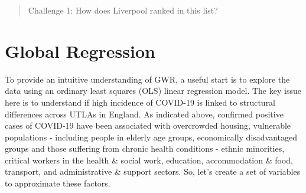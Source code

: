 \documentclass[
  letterpaper,
  DIV=11,
  numbers=noendperiod,
  oneside]{scrreprt}
\begin{document}
\begin{quote}
Challenge 1: How does Liverpool ranked in this list?
\end{quote}

\section{Global Regression}\label{global-regression}

To provide an intuitive understanding of GWR, a useful start is to
explore the data using an ordinary least squares (OLS) linear regression
model. The key issue here is to understand if high incidence of COVID-19
is linked to structural differences across UTLAs in England. As
indicated above, confirmed positive cases of COVID-19 have been
associated with overcrowded housing, vulnerable populations - including
people in elderly age groups, economically disadvantaged groups and
those suffering from chronic health conditions - ethnic minorities,
critical workers in the health \& social work, education, accommodation
\& food, transport, and administrative \& support sectors. So, let's
create a set of variables to approximate these factors.
\end{document}

